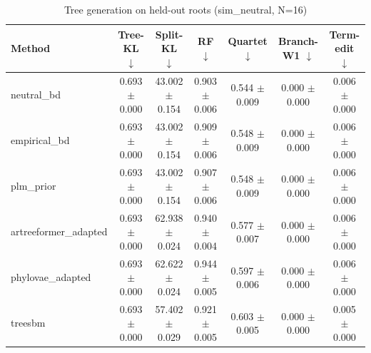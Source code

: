 \begin{table}[t]\centering
\caption{Tree generation on held-out roots (sim_neutral, N=16)}
\begin{tabular}{lcccccc}
\toprule
Method & Tree-KL $\downarrow$ & Split-KL $\downarrow$ & RF $\downarrow$ & Quartet $\downarrow$ & Branch-W1 $\downarrow$ & Term-edit $\downarrow$ \\
\midrule
neutral\_bd & 0.693 $\pm$ 0.000 & 43.002 $\pm$ 0.154 & 0.903 $\pm$ 0.006 & 0.544 $\pm$ 0.009 & 0.000 $\pm$ 0.000 & 0.006 $\pm$ 0.000 \\
empirical\_bd & 0.693 $\pm$ 0.000 & 43.002 $\pm$ 0.154 & 0.909 $\pm$ 0.006 & 0.548 $\pm$ 0.009 & 0.000 $\pm$ 0.000 & 0.006 $\pm$ 0.000 \\
plm\_prior & 0.693 $\pm$ 0.000 & 43.002 $\pm$ 0.154 & 0.907 $\pm$ 0.006 & 0.548 $\pm$ 0.009 & 0.000 $\pm$ 0.000 & 0.006 $\pm$ 0.000 \\
artreeformer\_adapted & 0.693 $\pm$ 0.000 & 62.938 $\pm$ 0.024 & 0.940 $\pm$ 0.004 & 0.577 $\pm$ 0.007 & 0.000 $\pm$ 0.000 & 0.006 $\pm$ 0.000 \\
phylovae\_adapted & 0.693 $\pm$ 0.000 & 62.622 $\pm$ 0.024 & 0.944 $\pm$ 0.005 & 0.597 $\pm$ 0.006 & 0.000 $\pm$ 0.000 & 0.006 $\pm$ 0.000 \\
treesbm & 0.693 $\pm$ 0.000 & 57.402 $\pm$ 0.029 & 0.921 $\pm$ 0.005 & 0.603 $\pm$ 0.005 & 0.000 $\pm$ 0.000 & 0.005 $\pm$ 0.000 \\
\bottomrule
\end{tabular}
\end{table}